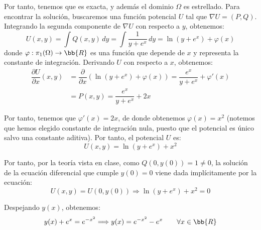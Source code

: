 \documentclass[12pt]{article}
\begin{document}
\begin{ejercicio}
        Por tanto, tenemos que es exacta, y además el dominio $\Omega$ es estrellado. Para encontrar la solución, buscaremos una función potencial $U$ tal que $\nabla U = (P,Q)$.
        Integrando la segunda componente de $\nabla U$ con respecto a $y$, obtenemos:
        \begin{equation*}
            U(x,y) = \int Q(x,y)\,dy = \int \dfrac{1}{y+e^x}\,dy = \ln(y+e^x) + \varphi(x)
        \end{equation*}
        donde $\varphi:\pi_1(\Omega)\to\bb{R}$ es una función que depende de $x$ y representa la constante de integración. Derivando $U$ con respecto a $x$, obtenemos:
        \begin{align*}
            \dfrac{\partial U}{\partial x}(x,y) &= \dfrac{\partial}{\partial x}(\ln(y+e^x) + \varphi(x)) = \dfrac{e^x}{y+e^x} + \varphi'(x)\\
            &= P(x,y) = \dfrac{e^x}{y+e^x} + 2x
        \end{align*}

        Por tanto, tenemos que $\varphi'(x) = 2x$, de donde obtenemos $\varphi(x) = x^2$ (notemos que hemos elegido constante de integración nula, puesto que el potencial es único salvo una constante aditiva).
        Por tanto, el potencial $U$ es:
        \begin{equation*}
            U(x,y) = \ln(y+e^x) + x^2
        \end{equation*}

        Por tanto, por la teoría vista en clase, como $Q(0,y(0))=1\neq 0$, la solución de la ecuación diferencial que cumple $y(0)=0$ viene dada implícitamente por la ecuación:
        \begin{equation*}
            U(x,y) = U(0,y(0))\Longrightarrow
            \ln(y+e^x) + x^2 = 0
        \end{equation*}

        Despejando $y(x)$, obtenemos:
        \begin{equation*}
            y(x)+e^x = e^{-x^2}\Longrightarrow y(x) = e^{-x^2}-e^x\qquad \forall x\in\bb{R}
        \end{equation*}
    \end{ejercicio}
\end{document}
